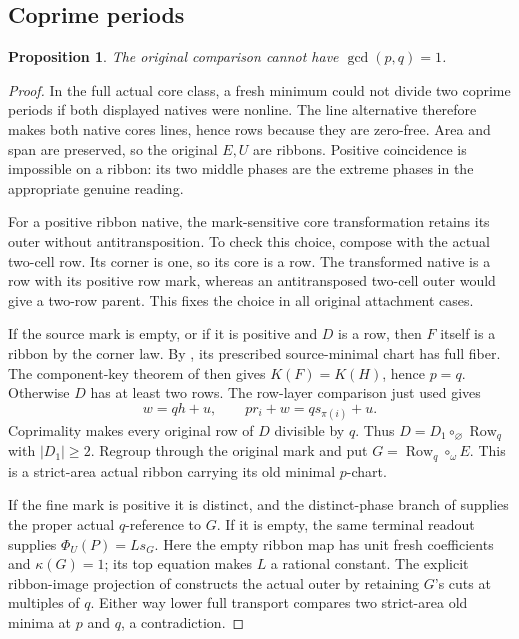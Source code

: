 \documentclass[11pt,a4paper]{amsart}
\numberwithin{equation}{section}
\theoremstyle{plain}
\newtheorem{proposition}[theorem]{Proposition}
\theoremstyle{definition}
\newcommand{\Row}{\operatorname{Row}}
\begin{document}
\subsection{Coprime periods}

\begin{proposition}\label{prop:coprime-exit}
The original comparison cannot have \(\gcd(p,q)=1\).
\end{proposition}
\begin{proof}
In the full actual core class, a fresh minimum could not divide two
coprime periods if both displayed natives were nonline.  The line
alternative therefore makes both native cores lines, hence rows because
they are zero-free.  Area and span are preserved, so the original \(E,U\)
are ribbons.  Positive coincidence is impossible on a ribbon: its two
middle phases are the extreme phases in the appropriate genuine reading.

For a positive ribbon native, the mark-sensitive core transformation
retains its outer without antitransposition.  To check this choice, compose
with the actual two-cell row.  Its corner is one, so its core is a row.
The transformed native is a row with its positive row mark, whereas an
antitransposed two-cell outer would give a two-row parent.  This fixes the
choice in all original attachment cases.

If the source mark is empty, or if it is positive and \(D\) is a row, then
\(F\) itself is a ribbon by the corner law.  By ,
its prescribed source-minimal chart has full fiber.  The component-key
theorem of \cite{Shields2026Gluing} then gives \(K(F)=K(H)\), hence
\(p=q\).  Otherwise \(D\) has at least two rows.
The row-layer comparison just used gives
\[
 w=qh+u,\qquad pr_i+w=qs_{\pi(i)}+u.
\]
Coprimality makes every original row of \(D\) divisible by \(q\).
Thus \(D=D_1\circ_{\varnothing}\Row_q\) with \(|D_1|\ge2\).
Regroup through the original mark and put \(G=\Row_q\circ_\omega E\).
This is a strict-area actual ribbon carrying its old minimal \(p\)-chart.

If the fine mark is positive it is distinct, and the distinct-phase
branch of  supplies the proper actual
\(q\)-reference to \(G\).  If it is empty, the same terminal readout supplies
\(\Phi_U(P)=L s_G\).  Here the empty ribbon map has unit fresh coefficients
and \(\kappa(G)=1\); its top equation makes \(L\) a rational constant.
The explicit ribbon-image projection of  constructs
the actual outer by retaining \(G\)'s cuts at multiples of \(q\).
Either way lower full transport compares two strict-area old minima at
\(p\) and \(q\), a contradiction.
\end{proof}
\end{document}
